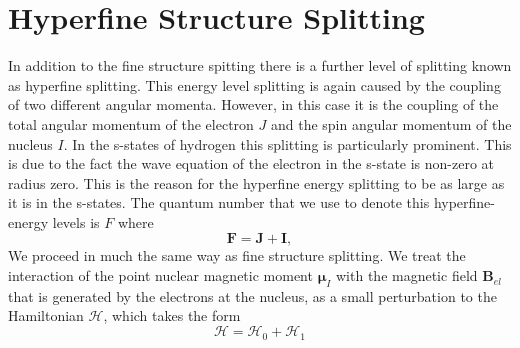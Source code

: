     \section{Hyperfine Structure Splitting}
	In addition to the fine structure spitting there is a further level of splitting known as hyperfine splitting. This energy level splitting is again caused by the coupling of two different angular momenta. However, in this case it is the coupling of the total angular momentum of the electron $J$ and the spin angular momentum of the nucleus $I$. In the s-states of hydrogen this splitting is particularly prominent. This is due to the fact the wave equation of the electron in the s-state is non-zero at radius zero. This is the reason for the hyperfine energy splitting to be as large as it is in the s-states. The quantum number that we use to denote this hyperfine-energy levels is $F$ where
	\begin{equation}
	    \textbf{F}=\textbf{J}+\textbf{I},
	\end{equation}
We proceed in much the same way as fine structure splitting. We treat the interaction of the point nuclear magnetic moment \(\mathbf{\mu}_I\) with the magnetic field \(\mathbf{B}_{el}\) that is generated by the electrons at the nucleus, as a small perturbation to the Hamiltonian $\mathscr{H}$, which takes the form \cite{woodgate3}
\begin{equation}
    \mathscr{H}=\mathscr{H}_0+\mathscr{H}_1
\end{equation}
